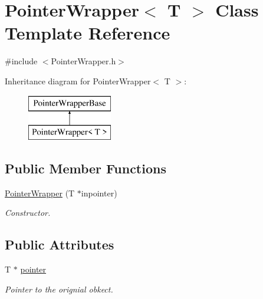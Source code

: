 \hypertarget{classPointerWrapper}{\section{Pointer\-Wrapper$<$ T $>$ Class Template Reference}
\label{classPointerWrapper}
}


{\ttfamily \#include $<$Pointer\-Wrapper.\-h$>$}

Inheritance diagram for Pointer\-Wrapper$<$ T $>$\-:\begin{figure}[H]
\begin{center}
\leavevmode
\includegraphics[height=2.000000cm]{classPointerWrapper}
\end{center}
\end{figure}
\subsection*{Public Member Functions}
\begin{DoxyCompactItemize}
\item 
\hyperlink{classPointerWrapper_aa645eb1963f91c9bddf5fd6ff578751b}{Pointer\-Wrapper} (T $\ast$inpointer)
\begin{DoxyCompactList}\small\item\em Constructor. \end{DoxyCompactList}\end{DoxyCompactItemize}
\subsection*{Public Attributes}
\begin{DoxyCompactItemize}
\item 
\hypertarget{classPointerWrapper_a4866798d33eed0a9aeaa3bcda53c4a0d}{T $\ast$ \hyperlink{classPointerWrapper_a4866798d33eed0a9aeaa3bcda53c4a0d}{pointer}}\label{classPointerWrapper_a4866798d33eed0a9aeaa3bcda53c4a0d}

\begin{DoxyCompactList}\small\item\em Pointer to the orignial obkect. \end{DoxyCompactList}\end{DoxyCompactItemize}


